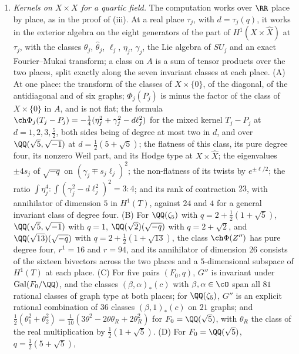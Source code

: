 \begin{enumerate}[label=\textup{(\Roman*)},leftmargin=*]
\item \emph{Kernels on $X\times X$ for a quartic field.} The computation
  works over $\RR$ place by place, as in the proof of
  (iii). At a real place $\tau_{j}$, with
  $d=\tau_{j}(q)$, it works in the exterior algebra on the eight generators
  of the part of $H^{1}(X\times\widehat X)$ at $\tau_{j}$, with the classes
  $\theta_{j}$, $\widehat\theta_{j}$, $\ell_{j}$, $\eta_{j}$, $\gamma_{j}$,
  the Lie algebra of $SU_{j}$ and an exact Fourier--Mukai transform; a class
  on $A$ is a sum of tensor products over the two places, split exactly along
  the seven invariant classes at each place. (A) At one place: the transform
  of the classes of $X\times\{0\}$, of the diagonal, of the antidiagonal and
  of six graphs; $\Phi_{j}(P_{j})$ is minus the factor of the class of
  $X\times\{0\}$ in $A$, and is not flat; the formula
  $\ch\Phi_{j}(T_{j}-P_{j})=-\frac14(\eta_{j}^{2}+\gamma_{j}^{2}-d\ell_{j}^{2})$
  for the mixed kernel $T_{j}-P_{j}$ at $d=1,2,3,\frac52$, both sides being
  of degree at most two in $d$, and over $\QQ(\sqrt5,\sqrt{-1})$ at
  $d=\frac12(5+\sqrt5)$; the flatness of this class, its pure degree four,
  its nonzero Weil part, and its Hodge type at $X\times\widehat X$; the
  eigenvalues $\pm4s_{j}$ of $\sqrt{-q}$ on $(\gamma_{j}\mp s_{j}\ell_{j})^{2}$;
  the non-flatness of its twists by $e^{\pm\ell/2}$; the ratio
  $\int\eta_{j}^{4}:\int(\gamma_{j}^{2}-d\ell_{j}^{2})^{2}=3:4$; and its rank
  of contraction $23$, with annihilator of dimension $5$ in $H^{1}(T)$,
  against $24$ and $4$ for a general invariant class of degree four. (B) For
  $\QQ(\zeta_{5})$ with $q=2+\frac12(1+\sqrt5)$, $\QQ(\sqrt5,\sqrt{-1})$ with
  $q=1$, $\QQ(\sqrt2)(\sqrt{-q})$ with $q=2+\sqrt2$, and
  $\QQ(\sqrt{13})(\sqrt{-q})$ with $q=2+\frac12(1+\sqrt{13})$, the class
  $\ch\Phi(Z'')$ has pure degree four, $r^{1}=16$ and $r=94$, and its
  annihilator of dimension $26$ consists of the sixteen bivectors across the
  two places and a $5$-dimensional subspace of $H^{1}(T)$ at each place. (C)
  For five pairs $(F_{0},q)$, $G''$ is invariant under
  $\mathrm{Gal}(F_{0}/\QQ)$, and the classes $(\beta,\alpha)_{*}(c)$ with
  $\beta,\alpha\in\cO$ span all $81$ rational classes of graph type at both
  places; for $\QQ(\zeta_{5})$, $G''$ is an explicit rational combination of
  $36$ classes $(\beta,1)_{*}(c)$ on $21$ graphs; and
  $\frac12(\theta_{1}^{2}+\theta_{2}^{2})
  =\frac1{10}(3\theta^{2}-2\theta\theta_{R}+2\theta_{R}^{2})$ for
  $F_{0}=\QQ(\sqrt5)$, with $\theta_{R}$ the class of the real multiplication
  by $\frac12(1+\sqrt5)$. (D) For $F_{0}=\QQ(\sqrt5)$, $q=\frac12(5+\sqrt5)$,

\end{enumerate}
